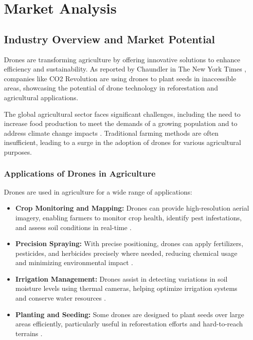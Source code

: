 \chapter{Market Analysis}

\section{Industry Overview and Market Potential}

Drones are transforming agriculture by offering innovative solutions to enhance efficiency and sustainability. As reported by Chaundler in The New York Times \cite{chaundler2021}, companies like CO2 Revolution are using drones to plant seeds in inaccessible areas, showcasing the potential of drone technology in reforestation and agricultural applications.

The global agricultural sector faces significant challenges, including the need to increase food production to meet the demands of a growing population and to address climate change impacts \citep{nazarov2023}. Traditional farming methods are often insufficient, leading to a surge in the adoption of drones for various agricultural purposes.

\subsection{Applications of Drones in Agriculture}

Drones are used in agriculture for a wide range of applications:

\begin{itemize} 
	\item \textbf{Crop Monitoring and Mapping:} Drones can provide high-resolution aerial imagery, enabling farmers to monitor crop health, identify pest infestations, and assess soil conditions in real-time \citep{nazarov2023, alliedmarketresearch2021}. 
	\item \textbf{Precision Spraying:} With precise positioning, drones can apply fertilizers, pesticides, and herbicides precisely where needed, reducing chemical usage and minimizing environmental impact \citep{guardianagriculture, plantdiseasedetection2023}.
	\item \textbf{Irrigation Management:} Drones assist in detecting variations in soil moisture levels using thermal cameras, helping optimize irrigation systems and conserve water resources \citep{nazarov2023}. 
	\item \textbf{Planting and Seeding:} Some drones are designed to plant seeds over large areas efficiently, particularly useful in reforestation efforts and hard-to-reach terrains \citep{chaundler2021}. 
\end{itemize}

